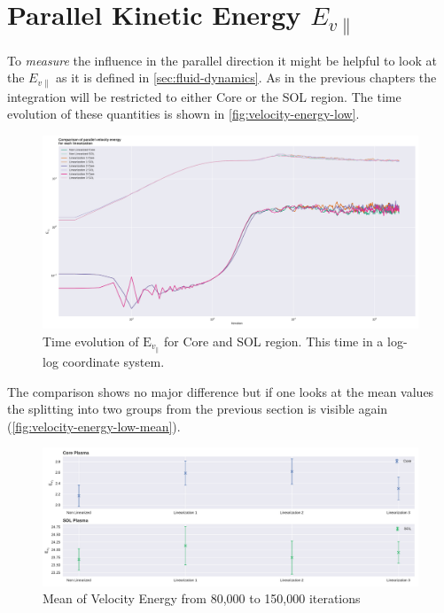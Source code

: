\documentclass[master.tex]{subfiles}
\begin{document}
\section{Parallel Kinetic Energy $E_{v\parallel}$}\label{sec:polar_parallel_velocities}

To \textit{measure} the influence in the parallel direction it might be helpful to look at the $E_{v\parallel}$ as it is defined in \autoref{sec:fluid-dynamics}.\newline
As in the previous chapters the integration will be restricted to either Core or the \ac{SOL} region. The time evolution of these quantities is shown in \autoref{fig:velocity-energy-low}.

\begin{figure}[!htbp]
    \includegraphics[width=\linewidth]{pdfs/velocity-energy-low.pdf}
    \caption{Time evolution of $\mathrm{E}_{v_\parallel}$ for Core and \ac{SOL} region. This time in a log-log coordinate system.}
    \label{fig:velocity-energy-low}
\end{figure}

The comparison shows no major difference but if one looks at the mean values the splitting into two groups from the previous section is visible again (\autoref{fig:velocity-energy-low-mean}).


\begin{figure}[!htbp]
    \includegraphics[width=\linewidth]{pdfs/velocity-energy-low-means.pdf}
    \caption{Mean of Velocity Energy from 80,000 to 150,000 iterations}
    \label{fig:velocity-energy-low-mean}
\end{figure}
\end{document}
